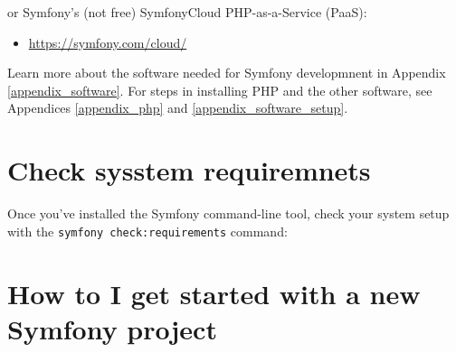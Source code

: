 \documentclass[a4paperpaper,openright]{book}
\newenvironment{Shaded}{}{}
\newcommand{\ExtensionTok}[1]{#1}
\newcommand{\NormalTok}[1]{#1}
\newcommand{\OperatorTok}[1]{\textcolor[rgb]{0.40,0.40,0.40}{#1}}
\providecommand{\tightlist}{%
  \setlength{\itemsep}{0pt}\setlength{\parskip}{0pt}}
\begin{document}
or Symfony's (not free) SymfonyCloud PHP-as-a-Service (PaaS):

\begin{itemize}
\tightlist
\item
  \url{https://symfony.com/cloud/}
\end{itemize}

Learn more about the software needed for Symfony developmnent in
Appendix \ref{appendix_software}. For steps in installing PHP and the
other software, see Appendices \ref{appendix_php} and
\ref{appendix_software_setup}.

\hypertarget{check-sysstem-requiremnets}{%
\section{Check sysstem requiremnets}\label{check-sysstem-requiremnets}}

Once you've installed the Symfony command-line tool, check your system
setup with the \texttt{symfony\ check:requirements} command:

\begin{Shaded}
\end{Shaded}

\hypertarget{how-to-i-get-started-with-a-new-symfony-project}{%
\section{How to I get started with a new Symfony
project}\label{how-to-i-get-started-with-a-new-symfony-project}}
\end{document}

